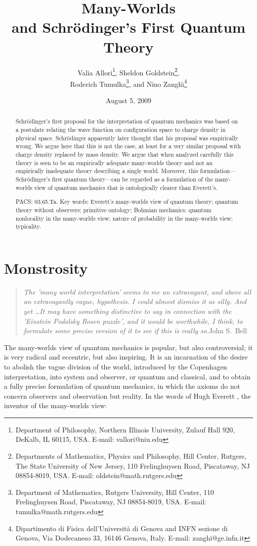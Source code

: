 \documentclass[12pt]{article}
\title{Many-Worlds\\ and Schr\"odinger's First Quantum Theory}
\author{
Valia Allori\footnote{Department of Philosophy, Northern Illinois University,
     Zulauf Hall 920, DeKalb, IL 60115, USA. E-mail: vallori@niu.edu},
Sheldon Goldstein\footnote{Departments of Mathematics, Physics and
     Philosophy, Hill Center, Rutgers, The State University of New  
     Jersey, 110 Frelinghuysen Road, Piscataway, NJ 08854-8019, USA.
     E-mail: oldstein@math.rutgers.edu},\\
Roderich Tumulka\footnote{Department of Mathematics,
     Rutgers University, Hill Center,  
     110 Frelinghuysen Road, Piscataway, NJ 08854-8019, USA.
     E-mail: tumulka@math.rutgers.edu},
 and Nino Zangh\`\i\footnote{Dipartimento di Fisica dell'Universit\`a
     di Genova and INFN sezione di Genova, Via Dodecaneso 33, 16146
     Genova, Italy. E-mail: zanghi@ge.infn.it}
}
\date{August 5, 2009}
\begin{document}
\maketitle%
\begin{abstract}
Schr\"odinger's first proposal for the interpretation of quantum mechanics was based on a postulate relating the wave function on configuration space to  charge density  in physical space. Schr\"odinger apparently later thought that his proposal was empirically wrong. We argue here that this is not the case, at least for a very similar proposal with charge density replaced by mass density. We argue that when analyzed carefully this theory is seen to be an empirically adequate many-worlds theory and not an empirically inadequate theory describing a single world. Moreover, this formulation---Schr\"odinger's first quantum theory---can be regarded as a formulation of the many-worlds view of quantum mechanics that is ontologically clearer than Everett's.
\medskip

\noindent 
 PACS: 03.65.Ta. 
 Key words: 
 Everett's many-worlds view of quantum theory;
 quantum theory without observers; 
 primitive ontology;
 Bohmian mechanics;
 quantum nonlocality in the many-worlds view;
 nature of probability in the many-worlds view;
 typicality.
\end{abstract}



\newpage
\section{Monstrosity}

\begin{quotation}
\noindent\textit{The 'many world interpretation' seems to me an extravagant, and above all an extravagantly vague, hypothesis. I could almost dismiss it as silly. And yet \ldots It may have something distinctive to say in connection with the 'Einstein Podolsky
Rosen puzzle', and it would be worthwhile, I think, to formulate some precise version of it to see if this is really so.}\hfill John S.\ Bell \cite{Bell86b}
\end{quotation}
The many-worlds view of quantum mechanics is  popular, but also controversial; it is very radical and eccentric, but also inspiring. It is an incarnation of the desire to abolish the vague division of the world, introduced by the Copenhagen interpretation, into system and observer, or quantum and classical, and to obtain a fully precise formulation of quantum mechanics, in which the axioms do not concern observers and observation but reality. In the words of Hugh Everett \cite{Eve57b}, the inventor of the many-worlds view:
\end{document}
